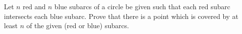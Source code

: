 Let $n$ red and $n$ blue subarcs of a circle be given such that each red subarc intersects each blue subarc. Prove that there is a point which is covered by at least $n$ of the given (red or blue) subarcs.